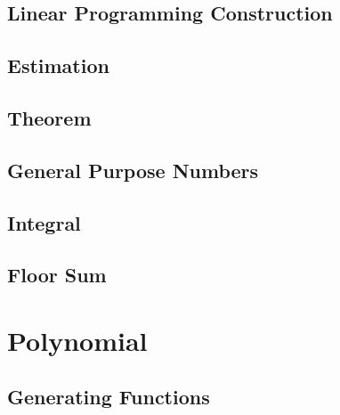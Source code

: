 \subsection{Linear Programming Construction}

\subsection{Estimation}

\subsection{Theorem}

\subsection{General Purpose Numbers}

\subsection{Integral}

\subsection{Floor Sum}


\section{Polynomial}
\subsection{Generating Functions}


